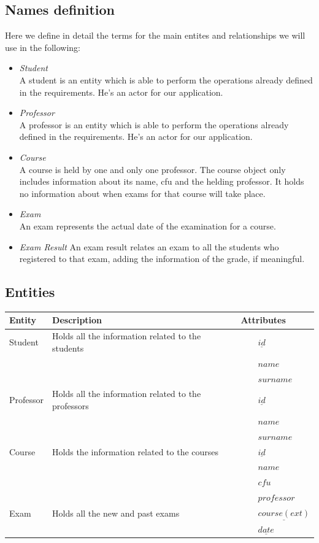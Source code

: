 \documentclass{report}
\newcommand{\tabitem}{~~\llap{\textbullet}~~}
\begin{document}
\subsection*{Names definition}
Here we define in detail the terms for the main entites and relationships we will use in the following:
\begin{itemize}
	\item \textit{Student}\\ A student is an entity which is able to perform the operations already defined in the requirements. He's an actor for our application. 	
	\item \textit{Professor}\\ A professor is an entity which is able to perform the operations already defined in the requirements. He's an actor for our application. 	
	\item \textit{Course}\\ A course is held by one and only one professor. The course object only includes information about its name, cfu and the helding professor. It holds no information about when exams for that course will take place. 	
	\item \textit{Exam}\\ An exam represents the actual date of the examination for a course.
	\item \textit{Exam Result} An exam result relates an exam to all the students who registered to that exam, adding the information of the grade, if meaningful.\\
\end{itemize} 
\newpage
\subsection*{Entities}
\begin{table}[ht]
	\centering
	\begin{tabular}{| m{6em} | m{15em} | m{8em} |}
		\hline
		\textbf{Entity} & \textbf{Description} & \textbf{Attributes} \\
		\hline
		Student & Holds all the information related to the students & 
		\tabitem $\underline{id}$ \\
		 & &\tabitem $name$ \\
		 & &\tabitem $surname$ \\
		\hline
		Professor & Holds all the information related to the professors & 
		\tabitem $\underline{id}$ \\
		& &\tabitem $name$ \\
		& &\tabitem $surname$ \\
		\hline
		Course & Holds the information related to the courses & 
		\tabitem $\underline{id}$ \\
		& &\tabitem $name$ \\
		& &\tabitem $cfu$ \\
		& &\tabitem $professor$ \\
		\hline
		Exam & Holds all the new and past exams& 
		\tabitem $\underline{course (ext)}$ \\
		& &\tabitem $\underline{date}$ \\
		\hline
	\end{tabular}
\end{table}
\vspace{10em}
\end{document}
